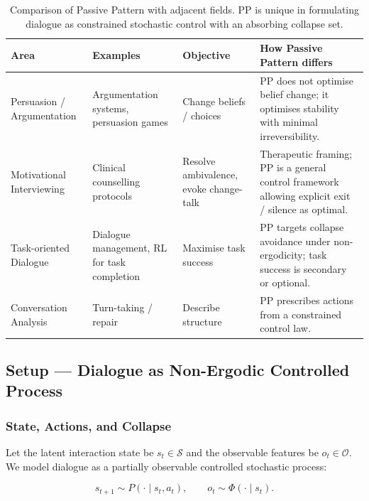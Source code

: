 \begin{table}[ht]
\centering
\small
\begin{tabularx}{\linewidth}{lXXX}
\toprule
\textbf{Area} & \textbf{Examples} & \textbf{Objective} & \textbf{How Passive Pattern differs} \\
\midrule
Persuasion / Argumentation
& Argumentation systems, persuasion games
& Change beliefs / choices
& PP does not optimise belief change; it optimises stability with
minimal irreversibility. \\

Motivational Interviewing
& Clinical counselling protocols
& Resolve ambivalence, evoke change-talk
& Therapeutic framing; PP is a general control framework allowing
explicit exit / silence as optimal. \\

Task-oriented Dialogue
& Dialogue management, RL for task completion
& Maximise task success
& PP targets collapse avoidance under non-ergodicity; task success
is secondary or optional. \\

Conversation Analysis
& Turn-taking / repair
& Describe structure
& PP prescribes actions from a constrained control law. \\
\bottomrule
\end{tabularx}
\caption[Related work]{Comparison of Passive Pattern with adjacent
fields. PP is unique in formulating dialogue as constrained
stochastic control with an absorbing collapse set.}
\label{tab:pp-related-work}
\end{table}

\subsection{Setup --- Dialogue as Non-Ergodic Controlled Process}
\label{sec:pp-setup}

\subsubsection{State, Actions, and Collapse}
\label{sec:pp-state-actions-collapse}

Let the latent interaction state be $s_t \in \mathcal{S}$ and the
observable features be $o_t \in \mathcal{O}$. We model dialogue as
a partially observable controlled stochastic process:

\begin{equation}
s_{t+1} \sim P(\cdot \mid s_t, a_t), \qquad
o_t \sim \Phi(\cdot \mid s_t).
\label{eq:pp-state-dynamics}
\end{equation}

